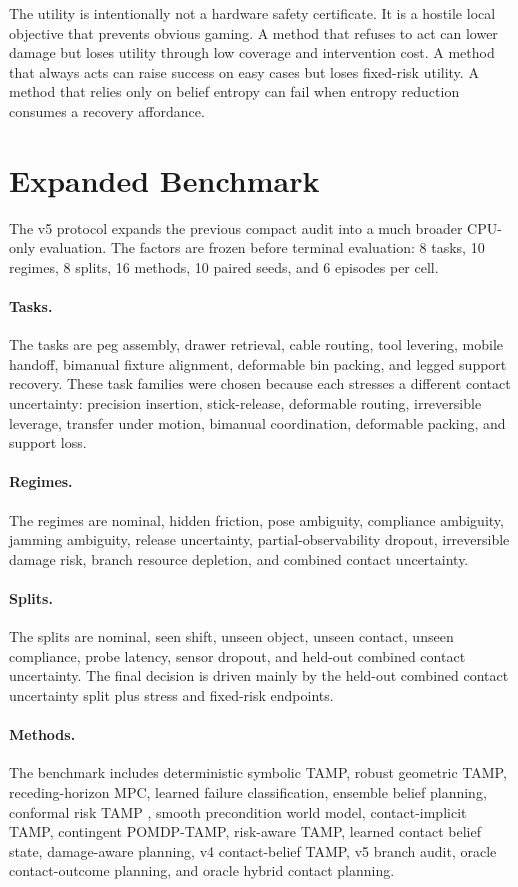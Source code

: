 \documentclass{article}
\begin{document}
The utility is intentionally not a hardware safety certificate. It is a hostile local objective that prevents obvious gaming. A method that refuses to act can lower damage but loses utility through low coverage and intervention cost. A method that always acts can raise success on easy cases but loses fixed-risk utility. A method that relies only on belief entropy can fail when entropy reduction consumes a recovery affordance.

\section{Expanded Benchmark}
The v5 protocol expands the previous compact audit into a much broader CPU-only evaluation. The factors are frozen before terminal evaluation: 8 tasks, 10 regimes, 8 splits, 16 methods, 10 paired seeds, and 6 episodes per cell.

\paragraph{Tasks.}
The tasks are peg assembly, drawer retrieval, cable routing, tool levering, mobile handoff, bimanual fixture alignment, deformable bin packing, and legged support recovery. These task families were chosen because each stresses a different contact uncertainty: precision insertion, stick-release, deformable routing, irreversible leverage, transfer under motion, bimanual coordination, deformable packing, and support loss.

\paragraph{Regimes.}
The regimes are nominal, hidden friction, pose ambiguity, compliance ambiguity, jamming ambiguity, release uncertainty, partial-observability dropout, irreversible damage risk, branch resource depletion, and combined contact uncertainty.

\paragraph{Splits.}
The splits are nominal, seen shift, unseen object, unseen contact, unseen compliance, probe latency, sensor dropout, and held-out combined contact uncertainty. The final decision is driven mainly by the held-out combined contact uncertainty split plus stress and fixed-risk endpoints.

\paragraph{Methods.}
The benchmark includes deterministic symbolic TAMP, robust geometric TAMP, receding-horizon MPC, learned failure classification, ensemble belief planning, conformal risk TAMP \citep{angelopoulos2021conformal,tibshirani2019conformal}, smooth precondition world model, contact-implicit TAMP, contingent POMDP-TAMP, risk-aware TAMP, learned contact belief state, damage-aware planning, v4 contact-belief TAMP, v5 branch audit, oracle contact-outcome planning, and oracle hybrid contact planning.
\end{document}
